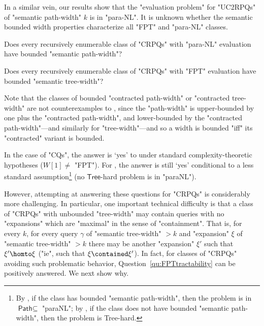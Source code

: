 In a similar vein, our results show that the "evaluation problem" for "UC2RPQs"
of "semantic path-width" $k$ is in "para-NL". It is unknown whether the semantic bounded width properties characterize all "FPT" and "para-NL" classes.

\begin{question}\AP\label{qu:paraNLtractability}
    Does every recursively enumerable class of "CRPQs" with "para-NL" evaluation have bounded "semantic path-width"?
\end{question}

\begin{question}\AP\label{qu:FPTtractability}
    Does every recursively enumerable class of "CRPQs" with "FPT" evaluation have bounded "semantic tree-width"?
\end{question}

Note that the classes of bounded "contracted path-width" or "contracted tree-width" are not counterexamples to , since
the "path-width" is upper-bounded by one plus the "contracted path-width", and lower-bounded by the "contracted path-width"---and similarly for "tree-width"---and so a width is bounded "iff" its "contracted" variant is bounded.

In the case of "CQs", the answer is `yes' to  \cite[Theorem~1]{Grohe2007ComplexityHomomorphism}
under standard complexity-theoretic hypotheses ($W[1] \neq $ "FPT"). For , the answer is still `yes' \cite[Theorem 3.1]{ChenMoritz13} conditional to a less standard assumption\footnote{By \cite[Theorems 3.1 \& 4.3]{ChenMoritz13}, if the class has bounded "semantic path-width", then the problem is in $\textsf{Path} \subseteq $ "paraNL"; by \cite[Theorems 3.1 \& 5.5]{ChenMoritz13}, if the class does not have bounded "semantic path-width", then the problem is \textsf{Tree}-hard.} (no $\textsf{Tree}$-hard problem is in "paraNL").

However, attempting at answering these questions for "CRPQs" is considerably more challenging. In particular, one important technical difficulty is that a class of "CRPQs" with unbounded "tree-width" may contain queries with no "expansions" which are "maximal" in the sense of "containment". That is, for every $k$, for every query $\gamma$ of "semantic tree-width" $>k$ and "expansion" $\xi$ of "semantic tree-width" $>k$ there may be another "expansion" $\xi'$ such that $\xi' \homto \xi$ ("ie", such that $\xi \contained \xi'$).  
In fact, for classes of "CRPQs" avoiding such problematic behavior, Question~\ref{qu:FPTtractability} can be positively answered. We next show why.


